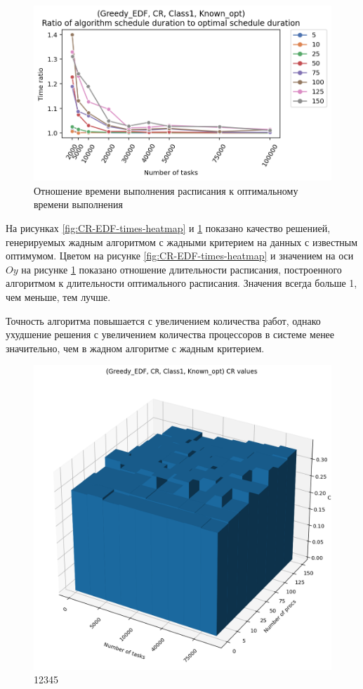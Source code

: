 \begin{figure}[!htbp]
    \centering
    \includegraphics[width=\textwidth]{imgs/ideal_1/CR_EDF/gr_amalgamated.png}
    \caption{Отношение времени выполнения расписания к оптимальному времени выполнения} 
    \label{fig:CR-EDF-times-compiled}
\end{figure}

На рисунках \ref{fig:CR-EDF-times-heatmap} и \ref{fig:CR-EDF-times-compiled} показано качество решенией, генерируемых жадным алгоритмом с жадными критерием на данных с известным оптимумом. Цветом на рисунке \ref{fig:CR-EDF-times-heatmap} и значением на оси $Oy$ на рисунке \ref{fig:CR-EDF-times-compiled} показано отношение длительности расписания, построенного алгоритмом к длительности оптимального расписания. Значения всегда больше 1, чем меньше, тем лучше.

Точность алгоритма повышается с увеличением количества работ, однако ухудшение решения с увеличением количества процессоров в системе менее значительно, чем в жадном алгоритме с жадным критерием. 

\begin{figure}[!htbp]
    \centering
    \includegraphics[width=\textwidth]{imgs/ideal_1/CR_EDF/cr_3d.png}
    \caption{12345}
\end{figure}

